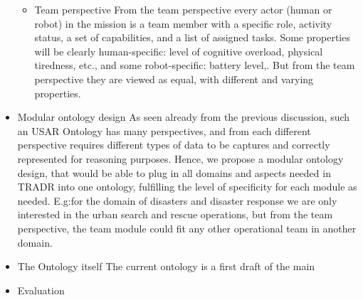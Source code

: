 \begin{itemize}
\begin{itemize}
\item Team perspective
From the team perspective every actor (human or robot) in the mission is a team member with a specific role, activity status, a set of capabilities, and a list of assigned tasks. Some properties will be clearly human-specific: level of cognitive overload, physical tiredness, etc., and some robot-specific: battery level,. But from the team perspective they are viewed as equal, with different and varying properties.  
\end{itemize}


\item Modular ontology design
As seen already from the previous discussion, such an USAR Ontology has many perspectives, and from each different perspective requires different types of data to be captures and correctly represented for reasoning purposes. Hence, we propose a modular ontology design, that would be able to plug in all domains and aspects needed in TRADR into one ontology, fulfilling the level of specificity for each module as needed. E.g:for the domain of disasters and disaster response we are only interested in the urban search and rescue operations, but from the team perspective, the team module could fit any other operational team in another domain.

\item The Ontology itself
The current ontology is a first draft of the main 
\item Evaluation

\end{itemize}
  